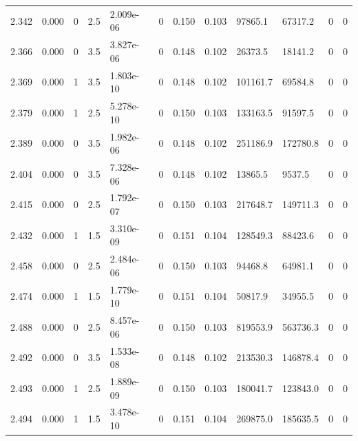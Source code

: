 \documentclass[preview]{standalone}
\begin{document}
{{{{{\begin{tabular}{L{1.2cm}C{1.2cm} C{0.3cm}C{0.5cm} C{1.4cm}C{1.4cm} C{1.4cm}C{1.4cm} C{1.6cm}C{1.6cm} C{1.6cm}C{1.6cm}}
  2.342  &  0.000  & 0     & 2.5 &  2.009e-06  & 0  &  0.150&   0.103& 97865.1 & 67317.2   &  0 & 0  \\ 
  2.366  &  0.000  & 0     & 3.5 &  3.827e-06  & 0  &  0.148&   0.102& 26373.5 & 18141.2   &  0 & 0  \\ 
  2.369  &  0.000  & 1     & 3.5 &  1.803e-10  & 0  &  0.148&   0.102& 101161.7 & 69584.8   &  0 & 0  \\ 
  2.379  &  0.000  & 1     & 2.5 &  5.278e-10  & 0  &  0.150&   0.103& 133163.5 & 91597.5   &  0 & 0  \\ 
  2.389  &  0.000  & 0     & 3.5 &  1.982e-06  & 0  &  0.148&   0.102& 251186.9 & 172780.8   &  0 & 0  \\ 
  2.404  &  0.000  & 0     & 3.5 &  7.328e-06  & 0  &  0.148&   0.102& 13865.5 & 9537.5   &  0 & 0  \\ 
  2.415  &  0.000  & 0     & 2.5 &  1.792e-07  & 0  &  0.150&   0.103& 217648.7 & 149711.3   &  0 & 0  \\ 
  2.432  &  0.000  & 1     & 1.5 &  3.310e-09  & 0  &  0.151&   0.104& 128549.3 & 88423.6   &  0 & 0  \\ 
  2.458  &  0.000  & 0     & 2.5 &  2.484e-06  & 0  &  0.150&   0.103& 94468.8 & 64981.1   &  0 & 0  \\ 
  2.474  &  0.000  & 1     & 1.5 &  1.779e-10  & 0  &  0.151&   0.104& 50817.9 & 34955.5   &  0 & 0  \\ 
  2.488  &  0.000  & 0     & 2.5 &  8.457e-06  & 0  &  0.150&   0.103& 819553.9 & 563736.3   &  0 & 0  \\ 
  2.492  &  0.000  & 0     & 3.5 &  1.533e-08  & 0  &  0.148&   0.102& 213530.3 & 146878.4   &  0 & 0  \\ 
  2.493  &  0.000  & 1     & 2.5 &  1.889e-09  & 0  &  0.150&   0.103& 180041.7 & 123843.0   &  0 & 0  \\ 
  2.494  &  0.000  & 1     & 1.5 &  3.478e-10  & 0  &  0.151&   0.104& 269875.0 & 185635.5   &  0 & 0  \\ 
\hline 
\end{tabular} 

}}}}}
\end{document}
